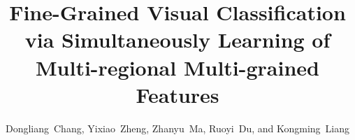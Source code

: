 \documentclass[journal]{IEEEtran}
\begin{document}
%

\title{Fine-Grained Visual Classification via Simultaneously Learning of Multi-regional Multi-grained Features}

%
%
%

\author{Dongliang~Chang,
        Yixiao~Zheng,
        Zhanyu~Ma,
        Ruoyi~Du,
        and Kongming~Liang}


% 
%
\end{document}
